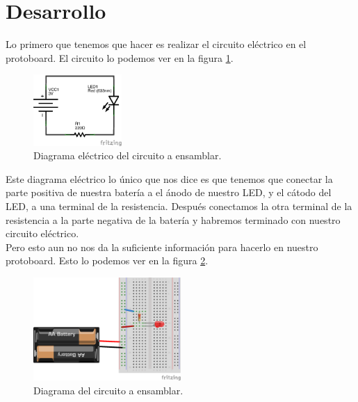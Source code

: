 
\section{Desarrollo}

    Lo primero que tenemos que hacer es realizar el circuito eléctrico en el protoboard. El circuito lo podemos ver en la figura \ref{dia:elecir}. \\

    \begin{figure}[h]
    	\begin{center}
    		\includegraphics[width=0.3\textwidth]{LED-bateria-diagrama.png} %
    		\caption{Diagrama eléctrico del circuito a ensamblar.}
    		\label{dia:elecir}
    	\end{center}
    \end{figure}

    Este diagrama eléctrico lo único que nos dice es que tenemos que conectar la parte positiva de nuestra batería a el ánodo de nuestro LED, y el cátodo del LED, a una terminal de la resistencia. Después conectamos la otra terminal de la resistencia a la parte negativa de la batería y habremos terminado con nuestro circuito eléctrico. \\

    Pero esto aun no nos da la suficiente información para hacerlo en nuestro protoboard. Esto lo podemos ver en la figura \ref{dia:cir}. \\

    \begin{figure}[h]
    	\begin{center}
    		\includegraphics[width=0.5\textwidth]{LED-bateria.png} %
    		\caption{Diagrama del circuito a ensamblar.}
    		\label{dia:cir}
    	\end{center}
    \end{figure}

